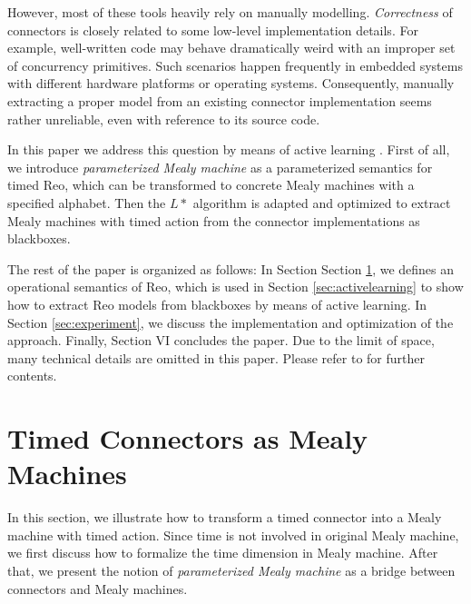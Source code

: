 \documentclass[conference, a4paper]{IEEEtran}
\begin{document}
However, most of these tools heavily rely on manually modelling.
\emph{Correctness} of connectors is closely related to some low-level implementation details.
For example, well-written code may behave dramatically weird with an improper set of concurrency
primitives. Such scenarios happen frequently in embedded systems with different hardware platforms or
operating systems. Consequently, manually extracting a proper model from an existing connector
implementation seems rather unreliable, even with reference to its source code.

In this paper we address this question by means of active learning \cite{de2010grammatical,
DBLP:journals/iandc/Angluin87, DBLP:conf/fase/RaffeltS06}.
First of all, we introduce \emph{parameterized Mealy machine} as a parameterized
semantics for timed Reo, which can be transformed to concrete Mealy machines with a
specified alphabet. Then the $L*$ algorithm \cite{DBLP:journals/iandc/Angluin87} is adapted and
optimized to extract Mealy machines with timed action from the connector implementations as
blackboxes. 

The rest of the paper is organized as follows: In Section
Section \ref{sec:semantics}, we defines an
operational semantics of Reo, which is used in Section \ref{sec:activelearning} to show how to
extract Reo models from blackboxes by means of active learning. In Section
\ref{sec:experiment}, we discuss the implementation and optimization of the approach. 
Finally, Section VI concludes the paper. Due to the limit of space, many technical details are
omitted in this paper.
Please refer to  for further contents.


\section{Timed Connectors as Mealy Machines}
\label{sec:semantics}

In this section, we illustrate how to transform a timed connector into a Mealy machine with timed
action.
Since time is not involved in original Mealy machine, we first discuss how to formalize the time
dimension in Mealy machine. After that, we present the notion of \emph{parameterized Mealy
machine} as a bridge between connectors and Mealy machines.


\end{document}
